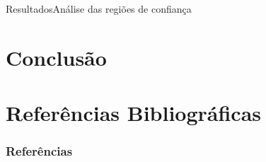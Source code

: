 \documentclass[10pt,xcolor={dvipsnames}]{beamer}
\begin{document}
\begin{frame}{Resultados}{Análise das regiões de confiança}
\begin{block}{}
	
\end{block}
\end{frame}

\section{Conclusão}
\subsection{}

\section{Referências Bibliográficas}
\begin{frame}[allowframebreaks]
	\frametitle{Referências}
%	
%	
	
\end{frame}

{\1
\begin{frame}
\end{frame}}
\end{document}
